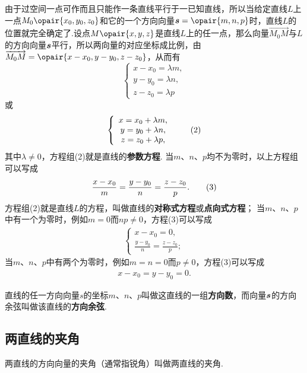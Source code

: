 由于过空间一点可作而且只能作一条直线平行于一已知直线，所以当给定直线\(L\)上一点\(M_0\opair{x_0,y_0,z_0}\)和它的一个方向向量\(\mat{s}=\opair{m,n,p}\)时，直线\(L\)的位置就完全确定了.设点\(M\opair{x,y,z}\)是直线\(L\)上的任一点，那么向量\(\vec{M_0M}\)与\(L\)的方向向量\(\boldsymbol{s}\)平行，所以两向量的对应坐标成比例，由\(\vec{M_0M}=\opair{x-x_0,y-y_0,z-z_0}\)，从而有\[
\left\{ \begin{array}{c}
x-x_0=\lambda m, \\
y-y_0=\lambda n, \\
z-z_0=\lambda p
\end{array} \right.
\]或\begin{gather}
\left\{ \begin{array}{c}
x=x_0+\lambda m, \\
y=y_0+\lambda n, \\
z=z_0+\lambda p,
\end{array} \right. \tag2
\end{gather}其中\(\lambda \neq 0\)，方程组(2)就是直线的\textbf{参数方程}.
当\(m\)、\(n\)、\(p\)均不为零时，以上方程组可以写成\begin{gather}
\frac{x-x_0}{m}=\frac{y-y_0}{n}=\frac{z-z_0}{p}. \tag3
\end{gather}
方程组(2)就是直线\(L\)的方程，叫做直线的\textbf{对称式方程}或\textbf{点向式方程}；
当\(m\)、\(n\)、\(p\)中有一个为零时，例如\(m=0\)而\(n p \neq 0\)，方程(3)可以写成\begin{gather}
\left\{ \begin{array}{l}
x-x_0=0, \\
\frac{y-y_0}{n}=\frac{z-z_0}{p};
\end{array} \right. \tag{3'}
\end{gather}
当\(m\)、\(n\)、\(p\)中有两个为零时，例如\(m=n=0\)而\(p \neq 0\)，方程(3)可以写成\begin{gather}
x-x_0=y-y_0=0. \tag{3''}
\end{gather}

\begin{definition}
直线的任一方向向量\(s\)的坐标\(m\)、\(n\)、\(p\)叫做这直线的一组\textbf{方向数}，而向量\(\boldsymbol{s}\)的方向余弦叫做该直线的\textbf{方向余弦}.
\end{definition}

\subsection{两直线的夹角}
\begin{definition}
两直线的方向向量的夹角（通常指锐角）叫做两直线的夹角.
\end{definition}


